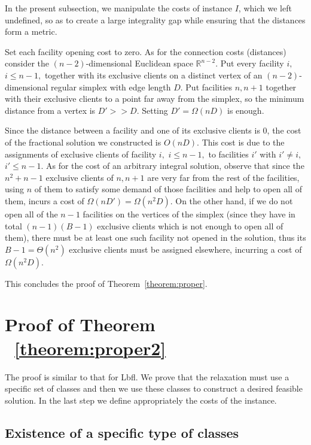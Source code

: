\documentclass[11pt]{article}\usepackage{amsmath}
\newcommand{\lbfl}{{\sc Lbfl}}
\begin{document}
In the  present subsection, we  manipulate the costs of  instance $I$,
which we left undefined, so as to create a large integrality gap while
ensuring that the distances form a metric.

Set each facility opening cost to zero. As for the connection costs (distances)
consider the $(n-2)$-dimensional Euclidean space $\mathbb{R}^{n-2}$. Put
every facility $i,$  $i\leq n-1,$ together with its  exclusive clients on a
distinct vertex of an $(n-2)$-dimensional regular simplex with edge length
$D$. Put facilities $n,n+1$ together with their exclusive clients to a point
far away  from the simplex, so  the minimum distance from  a vertex is
$D' >> D.$ Setting $D'=\Omega(nD)$ is enough.

Since the distance between a facility and one of its exclusive clients
is  $0$,  the  cost  of  the fractional  solution  we  constructed  is
$O(nD)$. This cost  is due to the assignments  of exclusive clients of
facility $i,$ $i \leq n-1,$ to facilities $i'$ with $i' \neq i,$ $i' \leq n-1.$ 
As  for the cost  of an arbitrary integral  solution, observe
that since the $n^2+n-1$ exclusive  clients of $n,n+1$ are very far from
the  rest of  the facilities,  using $n$  of them  to  satisfy some
demand of  those facilities and help  to open all of  them, incurs a
cost of $\Omega(nD') = \Omega(n^2D).$ On the other hand, if we do not open all of the $n-1$
facilities on  the vertices of the  simplex (since they  have in total
$(n-1)(B-1)$  exclusive clients  which is  not enough  to open  all of
them), there  must be  at least  one such facility  not opened  in the
solution, thus its $B-1=\Theta(n^2)$ exclusive clients must be assigned elsewhere,
incurring a cost of  $\Omega(n^2D).$

This concludes the proof of Theorem~\ref{theorem:proper}. 




\section{Proof of Theorem ~\ref{theorem:proper2}} 
\label{sec:proof_theorem_p2}

The proof is similar to that for \lbfl. 
We prove that the relaxation must use 
a specific set of classes and then we use these classes to construct a
desired feasible solution. In the last step we 
 define appropriately  the costs of the instance. 

\subsection{Existence of a specific type of classes}
\end{document}
